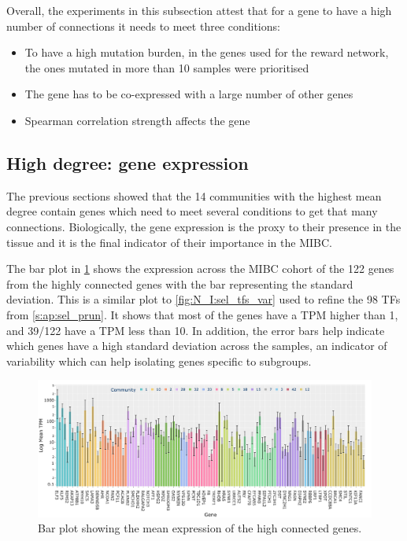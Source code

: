 Overall, the experiments in this subsection attest that for a gene to have a high number of connections it needs to meet three conditions:
\begin{itemize}
    \item To have a high mutation burden, in the genes used for the reward network, the ones mutated in more than 10 samples were prioritised
    \item The gene has to be co-expressed with a large number of other genes
    \item Spearman correlation strength affects the gene

\end{itemize}


\subsection{High degree: gene expression} \label{s:N_II:high_ge}

The previous sections showed that the 14 communities with the highest mean degree contain genes which need to meet several conditions to get that many connections. Biologically, the gene expression is the proxy to their presence in the tissue and it is the final indicator of their importance in the MIBC.

The bar plot in \cref{fig:N_II:exp_molecular_highCon} shows the expression across the MIBC cohort of the 122 genes from the highly connected genes with the bar representing the standard deviation. This is a similar plot to \cref{fig:N_I:sel_tfs_var} used to refine the  98 TFs from \cref{s:ap:sel_prun}. It shows that most of the genes have a TPM higher than 1, and 39/122 have a TPM less than 10. In addition, the error bars help indicate which genes have a high standard deviation across the samples, an indicator of variability which can help isolating genes specific to subgroups. 


\begin{figure}[!htb]    
    \centering
    \includegraphics[width=1.0\textwidth,height=1.0\textheight,keepaspectratio]{Sections/Network_II/resources/reward/smallCom_Exp.png}
   \caption{Bar plot showing the mean expression of the high connected genes.}
    \label{fig:N_II:exp_molecular_highCon}
\end{figure}


